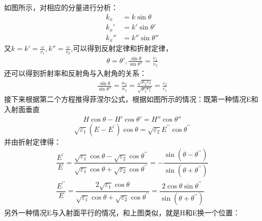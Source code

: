 \documentclass[UTF8]{article}
\begin{document}
如图所示，对相应的分量进行分析：
\begin{align*}
    k_x   & =k\sin \theta      \\
    k_x'  & =k'\sin \theta'    \\
    k_x'' & =k'' \sin \theta''
\end{align*}
又$k=k'=\frac{\omega}{v_1},k''=\frac{\omega}{v_2}$,可以得到反射定律和折射定律，
\begin{align*}
    \theta =\theta ',\frac{\sin \theta}{\sin \theta''}=\frac{v_1}{v_2}
\end{align*}
还可以得到折射率和反射角与入射角的关系：
\begin{align*}
    \frac{\sin \theta}{\sin \theta''}=\frac{n_2}{n_1}=\frac{\sqrt{\mu_2\varepsilon_2}}{\sqrt{\mu_1\varepsilon_1}}=\frac{\varepsilon_2}{\varepsilon_1}
\end{align*}
接下来根据第二个方程推得菲涅尔公式，根据如图所示的情况：既第一种情况E和入射面垂直
\begin{align*}
    H\cos  \theta -H'\cos\theta'=H''\cos \theta''
\end{align*}
$$
    \sqrt{\varepsilon_{1}}\left(E-E^{\prime}\right) \cos \theta=\sqrt{\varepsilon_{2}} E^{\prime \prime} \cos \theta^{\prime \prime}
$$
并由折射定律得：
$$
    \begin{array}{l}
        \dfrac{E^{\prime}}{E}=\dfrac{\sqrt{\varepsilon_{1}} \cos \theta-\sqrt{\varepsilon_{2}} \cos \theta^{\prime \prime}}{\sqrt{\varepsilon_{1}} \cos \theta+\sqrt{\varepsilon_{2}} \cos \theta^{\prime \prime}}=-\dfrac{\sin \left(\theta-\theta^{\prime \prime}\right)}{\sin \left(\theta+\theta^{\prime \prime}\right)} \\[0.5cm]
        \dfrac{E^{\prime \prime}}{E}=\dfrac{2 \sqrt{\varepsilon_{1}} \cos \theta}{\sqrt{\varepsilon_{1}} \cos \theta+\sqrt{\varepsilon_{2}} \cos \theta^{\prime \prime}}=\dfrac{2 \cos \theta \sin \theta^{\prime \prime}}{\sin \left(\theta+\theta^{\prime \prime}\right)}
    \end{array}
$$
另外一种情况E与入射面平行的情况，和上图类似，就是H和E换一个位置：
\end{document}
